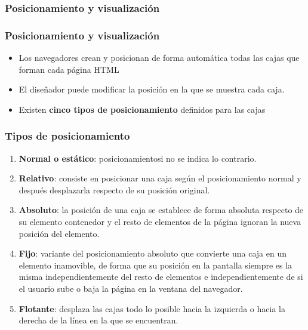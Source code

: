 \documentclass[ucs]{beamer}
\begin{document}
\subsubsection*{Posicionamiento y visualización}


\begin{frame}
\frametitle{Posicionamiento y visualización}

\begin{itemize}
  \item Los navegadores crean y posicionan de forma automática todas las cajas que forman cada página HTML
  \item El diseñador puede modificar la posición en la que se muestra cada caja.
  \item Existen {\bf cinco tipos de posicionamiento} definidos para las cajas
\end{itemize}

\end{frame}




\begin{frame}
\frametitle{Tipos de posicionamiento}

\begin{enumerate}
  \item {\bf Normal o estático}: posicionamientosi no se indica lo contrario.
  \item{\bf Relativo}: consiste en posicionar una caja según el posicionamiento normal y después desplazarla respecto de su posición original.
  \item {\bf Absoluto}: la posición de una caja se establece de forma absoluta respecto de su elemento contenedor y el resto de elementos de la página ignoran la nueva posición del elemento.
  \item {\bf Fijo}: variante del posicionamiento absoluto que convierte una caja en un elemento inamovible, de forma que su posición en la pantalla siempre es la misma independientemente del resto de elementos e independientemente de si el usuario sube o baja la página en la ventana del navegador.
  \item {\bf Flotante}: desplaza las cajas todo lo posible hacia la izquierda o hacia la derecha de la línea en la que se encuentran.
\end{enumerate}

\end{frame}
\end{document}
